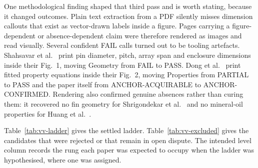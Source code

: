 One methodological finding shaped that third pass and is worth stating, because it changed
outcomes. Plain text extraction from a PDF silently misses dimension callouts that exist as
vector-drawn labels inside a figure. Pages carrying a figure-dependent or absence-dependent claim
were therefore rendered as images and read visually. Several confident FAIL calls turned out to be
tooling artefacts. Shahsavar et al.~\cite{shahsavar2021} print pin diameter, pitch, array span and
enclosure dimensions inside their Fig.~1, moving Geometry from FAIL to PASS. Dong et
al.~\cite{dong2026} print fitted property equations inside their Fig.~2, moving Properties from
PARTIAL to PASS and the paper itself from ANCHOR-ACQUIRABLE to ANCHOR-CONFIRMED. Rendering also
confirmed genuine absences rather than curing them: it recovered no fin geometry for Shrigondekar
et al.~\cite{shrigondekar2023} and no mineral-oil properties for Huang et
al.~\cite{huang2023ijhmt}.

Table~\ref{tab:vv-ladder} gives the settled ladder. Table~\ref{tab:vv-excluded} gives the
candidates that were rejected or that remain in open dispute. The intended level column records
the rung each paper was expected to occupy when the ladder was hypothesised, where one was
assigned.

